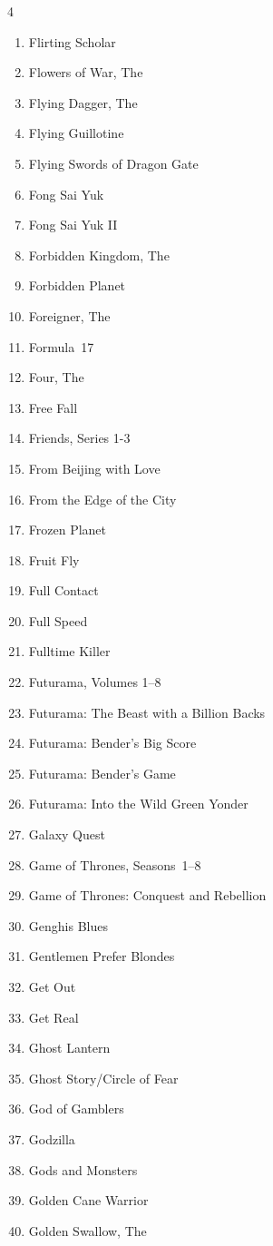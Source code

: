 \documentclass{article}
\begin{document}
\begin{multicols}{4}
\begin{enumerate}
\item Flirting Scholar
\item Flowers of War, The
\item Flying Dagger, The
\item Flying Guillotine
\item Flying Swords of Dragon Gate
\item Fong Sai Yuk
\item Fong Sai Yuk II
\item Forbidden Kingdom, The
\item Forbidden Planet
\item Foreigner, The
\item Formula~17
\item Four, The
\item Free Fall
\item Friends, Series 1-3
\item From Beijing with Love
\item From the Edge of the City
\item Frozen Planet
\item Fruit Fly
\item Full Contact
\item Full Speed
\item Fulltime Killer
\item Futurama, Volumes 1--8
\item Futurama: The Beast with a Billion Backs
\item Futurama: Bender's Big Score
\item Futurama: Bender's Game
\item Futurama: Into the Wild Green Yonder
\item Galaxy Quest
\item Game of Thrones, Seasons~1--8
\item Game of Thrones: Conquest and Rebellion
\item Genghis Blues
\item Gentlemen Prefer Blondes
\item Get Out
\item Get Real
\item Ghost Lantern
\item Ghost Story/Circle of Fear
\item God of Gamblers
\item Godzilla
\item Gods and Monsters
\item Golden Cane Warrior
\item Golden Swallow, The

\end{enumerate}
\end{multicols}
\end{document}
